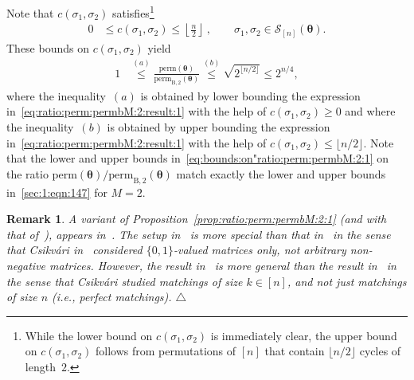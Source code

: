 \documentclass[journal,lettersize,twocolumn]{IEEEtran} %
\newtheorem{remark}[theorem]{Remark}
\newcommand{\eremark}{\hfill$\triangle$}
\newcommand{\set}[1]{\mathcal{#1}}
\newcommand{\matr}[1]{ \bm{#1} }
\newcommand{\perm}{ \mathrm{perm} }
\newcommand{\permbM}[1]{\perm_{ \mathrm{B}, #1 }}
\newcommand{\setS}{\set{S}}
\newcommand{\mtheta}{\matr{\theta}}
\newcommand{\ie}{\textit{i.e.}}
\begin{document}
%

Note that $c(\sigma_1,\sigma_2)$ satisfies\footnote{While the lower bound on
  $c(\sigma_1,\sigma_2)$ is immediately clear, the upper bound on
  $c(\sigma_1,\sigma_2)$ follows from permutations of $[n]$ that contain
  $\lfloor n/2 \rfloor $ cycles of length~$2$.}
\begin{align*}
  0 
    &\leq 
       c(\sigma_1,\sigma_2) 
     \leq 
       \left\lfloor \frac{n}{2} \right\rfloor \ , 
       \qquad \sigma_1,\sigma_{2} \in \setS_{[n]}(\mtheta).
\end{align*}
These bounds on $c(\sigma_1,\sigma_2)$ yield
\begin{align}
  1
    &\overset{(a)}{\leq}
       \frac{ \perm(\mtheta) }{ \permbM{2}(\mtheta) }
     \overset{(b)}{\leq}
       \sqrt{2^{\lfloor n/2 \rfloor}}
     \leq
        2^{n/4},
          \label{eq:bounds:on"ratio:perm:permbM:2:1}
\end{align}
where the inequality~$(a)$ is obtained by lower bounding the expression
in~\eqref{eq:ratio:perm:permbM:2:result:1} with the help of
$c(\sigma_1,\sigma_2) \geq 0$ and where the inequality~$(b)$ is obtained by
upper bounding the expression in~\eqref{eq:ratio:perm:permbM:2:result:1} with
the help of $c(\sigma_1,\sigma_2) \leq \lfloor n/2 \rfloor$. Note that the
lower and upper bounds in~\eqref{eq:bounds:on"ratio:perm:permbM:2:1} on the
ratio $\perm(\mtheta) / \permbM{2}(\mtheta)$ match exactly the lower and upper
bounds in~\eqref{sec:1:eqn:147} for $M = 2$.

%

\begin{remark}
  A variant of Proposition~\ref{prop:ratio:perm:permbM:2:1} (and with that
  of~\cite[Proposition 2]{KitShing2022}), appears in~\cite[Lemma
  4.2]{Csikvari2017}. The setup in~\cite{Csikvari2017} is more special than
  that in~\cite{KitShing2022} in the sense that Csikv{\'a}ri
  in~\cite{Csikvari2017} considered $\{0,1\}$-valued matrices only, not
  arbitrary non-negative matrices. However, the result in~\cite{Csikvari2017}
  is more general than the result in~\cite{KitShing2022} in the sense that
  Csikv{\'a}ri studied matchings of size $k \in [n]$, and not just matchings
  of size $n$ (\ie, perfect matchings).  \eremark
\end{remark}

%
\end{document}
